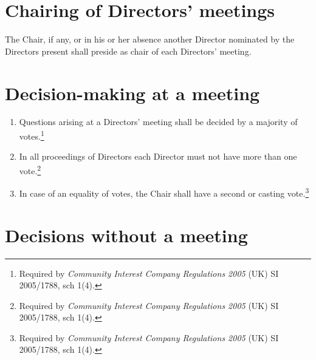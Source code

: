 \documentclass[a4paper,12pt]{article}
\begin{document}
\section{Chairing of Directors' meetings}

The Chair, if any, or in his or her absence another Director nominated by the Directors present shall preside as chair of each Directors' meeting.

\section{Decision-making at a meeting}

\begin{enumerate}
  \color{red}
  \item Questions arising at a Directors' meeting shall be decided by a majority of votes.\footnote{Required by \textit{Community Interest Company Regulations 2005} (UK) SI 2005/1788, sch 1(4).}
  \item In all proceedings of Directors each Director must not have more than one vote.\footnote{Required by \textit{Community Interest Company Regulations 2005} (UK) SI 2005/1788, sch 1(4).}
  \item In case of an equality of votes, the Chair shall have a second or casting vote.\footnote{Required by \textit{Community Interest Company Regulations 2005} (UK) SI 2005/1788, sch 1(4).}\color{black}
\end{enumerate}

\section{Decisions without a meeting}
\end{document}
